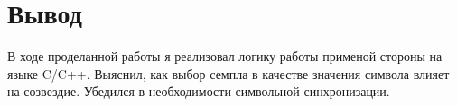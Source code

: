 \chapter{Вывод}
\label{ch:chap3}

В ходе проделанной работы я реализовал логику работы применой стороны на языке C/C++. Выяснил, как выбор семпла в качестве 
значения символа влияет на созвездие. Убедился в необходимости символьной синхронизации. 
\endinput